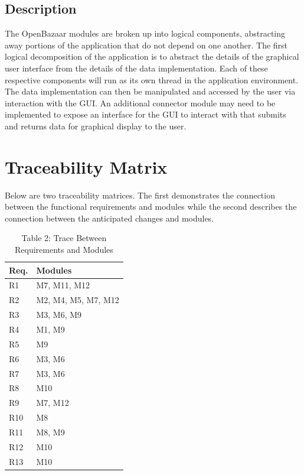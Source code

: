 \documentclass{article}
\begin{document}
\subsection*{Description}
The OpenBazaar modules are broken up into logical components, abstracting away portions of the application that do not depend on one another. The first logical decomposition of the application is to abstract the details of the graphical user interface from the details of the data implementation. Each of these respective components will run as its own thread in the application environment. The data implementation can then be manipulated and accessed by the user via interaction with the GUI. An additional connector module may need to be implemented to expose an interface for the GUI to interact with that submits and returns data for graphical display to the user.



\section*{Traceability Matrix}

Below are two traceability matrices. The first demonstrates the connection between the functional requirements and modules while the second describes the connection between the anticipated changes and modules.

\begin{table}[h!]
	\centering
	\begin{tabular}{p{} p{}}
		\toprule
		\textbf{Req.} & \textbf{Modules}\\
		\midrule
		R1 & M7, M11, M12\\
		R2 & M2, M4, M5, M7, M12\\
		R3 & M3, M6, M9\\
		R4 & M1, M9\\
		R5 & M9\\
		R6 & M3, M6\\
		R7 & M3, M6\\
		R8 & M10\\
		R9 & M7, M12\\
		R10 & M8\\ %
		R11 & M8, M9 \\ %
		R12 & M10\\
		R13 & M10\\
		\bottomrule
	\end{tabular}
	\caption{Table 2: Trace Between Requirements and Modules}
	
\end{table}
\end{document}
